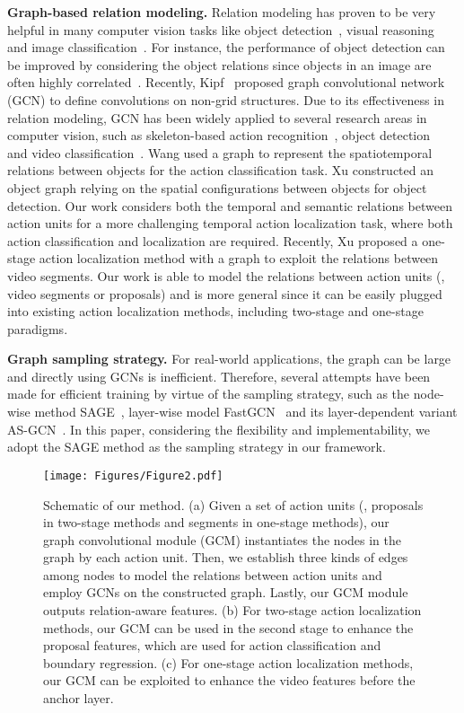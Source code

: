 \documentclass[10pt,journal,compsoc]{IEEEtran}
\begin{document}
	\noindent \textbf{Graph-based relation modeling.}
	Relation modeling has proven to be very helpful in many computer vision tasks like object detection~\cite{hu2018relation}, visual reasoning~\cite{chen2018iterative} and image classification~\cite{wang2018non}. For instance, the performance of object detection can be improved by considering the object relations since objects in an image are often highly correlated~\cite{hu2018relation}. Recently, Kipf~\etal\cite{kipf2017semi} proposed graph convolutional network (GCN) to define convolutions on non-grid structures. Due to its effectiveness in relation modeling, GCN has been widely applied to several research areas in computer vision, such as skeleton-based action recognition~\cite{yan2018spatial}, object detection~\cite{xu2019spatial} and video classification~\cite{wang2018video}. Wang \etal\cite{wang2018video} used a graph to represent the spatiotemporal relations between objects for the action classification task. Xu \etal\cite{xu2019spatial} constructed an object graph relying on the spatial configurations between objects for object detection. Our work considers both the temporal and semantic relations between action units for a more challenging temporal action localization task, where both action classification and localization are required. Recently, Xu \etal\cite{xu2020gtad} proposed a one-stage action localization method with a graph to exploit the relations between video segments. Our work is able to model the relations between action units (\ie, video segments or proposals) and is more general since it can be easily plugged into existing action localization methods, including two-stage and one-stage paradigms.
	
	\noindent \textbf{Graph sampling strategy.} 
	For real-world applications, the graph can be large and directly using GCNs is inefficient. Therefore, several attempts have been made for efficient training by virtue of the sampling strategy, such as the node-wise method SAGE~\cite{hamilton2017inductive}, layer-wise model FastGCN~\cite{chen2018fastgcn} and its layer-dependent variant AS-GCN~\cite{huang2018adaptive}. In this paper, considering the flexibility and implementability, we adopt the SAGE method as the sampling strategy in our framework.
	
	\begin{figure*}[!t]
		\centering
		\texttt{[image: Figures/Figure2.pdf]}
		\caption{Schematic of our method. 
			(a) Given a set of action units (\eg, proposals in two-stage methods and segments in one-stage methods), our graph convolutional module (GCM) instantiates the nodes in the graph by each action unit. Then, we establish three kinds of edges among nodes to model the relations between action units and employ GCNs on the constructed graph. Lastly, our GCM module outputs relation-aware features. (b) For two-stage action localization methods, our GCM can be used in the second stage to enhance the proposal features, which are used for action classification and boundary regression. (c) For one-stage action localization methods, our GCM can be exploited to enhance the video features before the anchor layer. }
		\label{Fig:framework}
	\end{figure*}
	
\end{document}
